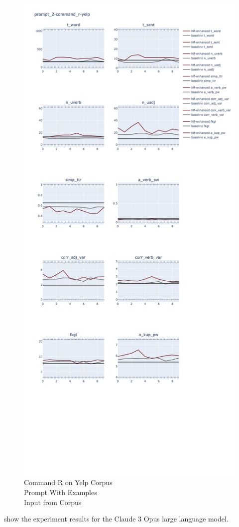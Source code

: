 \documentclass[a4paper,twoside]{article}
\begin{document}
\begin{figure}[ht]
    \includegraphics[width=\textwidth,height=0.9\textheight,scale=1]{plots/prompt_2_ifd/prompt_2-command_r-yelp/prompt_2-command_r-yelp.png}
    \caption{Command R on Yelp Corpus\\Prompt With Examples\\Input from Corpus}\label{fig:command_r-prompt2-yelp-ifd}
\end{figure}

show the experiment results for the Claude 3 Opus large language model.
\end{document}
